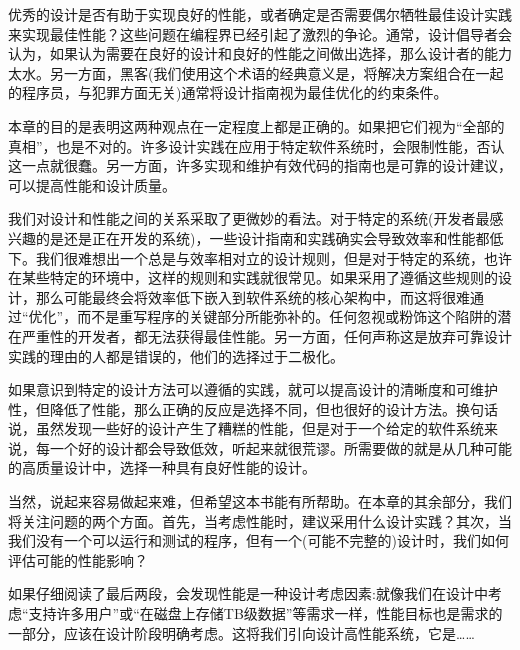 优秀的设计是否有助于实现良好的性能，或者确定是否需要偶尔牺牲最佳设计实践来实现最佳性能？这些问题在编程界已经引起了激烈的争论。通常，设计倡导者会认为，如果认为需要在良好的设计和良好的性能之间做出选择，那么设计者的能力太水。另一方面，黑客(我们使用这个术语的经典意义是，将解决方案组合在一起的程序员，与犯罪方面无关)通常将设计指南视为最佳优化的约束条件。 

本章的目的是表明这两种观点在一定程度上都是正确的。如果把它们视为“全部的真相”，也是不对的。许多设计实践在应用于特定软件系统时，会限制性能，否认这一点就很蠢。另一方面，许多实现和维护有效代码的指南也是可靠的设计建议，可以提高性能和设计质量。 

我们对设计和性能之间的关系采取了更微妙的看法。对于特定的系统(开发者最感兴趣的是还是正在开发的系统)，一些设计指南和实践确实会导致效率和性能都低下。我们很难想出一个总是与效率相对立的设计规则，但是对于特定的系统，也许在某些特定的环境中，这样的规则和实践就很常见。如果采用了遵循这些规则的设计，那么可能最终会将效率低下嵌入到软件系统的核心架构中，而这将很难通过“优化”，而不是重写程序的关键部分所能弥补的。任何忽视或粉饰这个陷阱的潜在严重性的开发者，都无法获得最佳性能。另一方面，任何声称这是放弃可靠设计实践的理由的人都是错误的，他们的选择过于二极化。 

如果意识到特定的设计方法可以遵循的实践，就可以提高设计的清晰度和可维护性，但降低了性能，那么正确的反应是选择不同，但也很好的设计方法。换句话说，虽然发现一些好的设计产生了糟糕的性能，但是对于一个给定的软件系统来说，每一个好的设计都会导致低效，听起来就很荒谬。所需要做的就是从几种可能的高质量设计中，选择一种具有良好性能的设计。 

当然，说起来容易做起来难，但希望这本书能有所帮助。在本章的其余部分，我们将关注问题的两个方面。首先，当考虑性能时，建议采用什么设计实践？其次，当我们没有一个可以运行和测试的程序，但有一个(可能不完整的)设计时，我们如何评估可能的性能影响？

如果仔细阅读了最后两段，会发现性能是一种设计考虑因素:就像我们在设计中考虑“支持许多用户”或“在磁盘上存储TB级数据”等需求一样，性能目标也是需求的一部分，应该在设计阶段明确考虑。这将我们引向设计高性能系统，它是……


































































